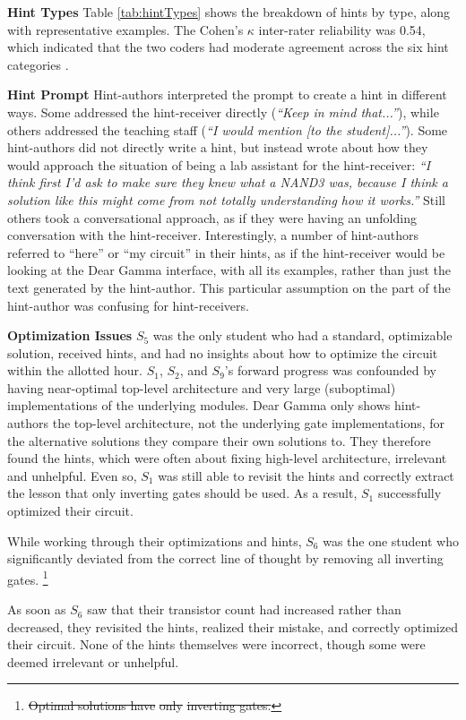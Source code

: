 \documentclass[12pt,twoside]{mitthesis}
\providecommand{\DIFaddtex}[1]{{\protect\color{blue}\uwave{#1}}} %
\providecommand{\DIFdeltex}[1]{{\protect\color{red}\sout{#1}}}                      %
\providecommand{\DIFaddbegin}{} %
\providecommand{\DIFaddend}{} %
\providecommand{\DIFdelbegin}{} %
\providecommand{\DIFdelend}{} %
\providecommand{\DIFadd}[1]{\texorpdfstring{\DIFaddtex{#1}}{#1}} %
\providecommand{\DIFdel}[1]{\texorpdfstring{\DIFdeltex{#1}}{}} %
\begin{document}
{\bf Hint Types} Table \ref{tab:hintTypes} shows the breakdown of hints by type, along with representative examples. The Cohen's $\kappa$ \cite{cohen1960coefficient} inter-rater reliability was 0.54, which indicated that the two coders had moderate agreement across the six hint categories \cite{viera2005understanding}. 

{\bf Hint Prompt} Hint-authors interpreted the prompt to create a hint in different ways. Some addressed the hint-receiver directly ({\it ``Keep in mind that...''}), while others addressed the teaching staff ({\it ``I would mention [to the student]...''}). Some hint-authors did not directly write a hint, but instead wrote about how they would approach the situation of being a lab assistant for the hint-receiver: {\it ``I think first I'd ask to make sure they knew what a NAND3 was, because I think a solution like this might come from not totally understanding how it works.''} Still others took a conversational approach, as if they were having an unfolding conversation with the hint-receiver. Interestingly, a number of hint-authors referred to ``here'' or ``my circuit'' in their hints, as if the hint-receiver would be looking at the Dear Gamma interface, with all its examples, rather than just the text generated by the hint-author. This particular assumption on the part of the hint-author was confusing for hint-receivers.

{\bf Optimization Issues} $S_5$ was the only student who had a standard, optimizable solution, received hints, and had no insights about how to optimize the circuit within the allotted hour. $S_1$, $S_2$, and $S_9$'s forward progress was confounded by having near-optimal top-level architecture and very large (suboptimal) implementations of the underlying modules. Dear Gamma only shows hint-authors the top-level architecture, not the underlying gate implementations, for the alternative solutions they compare their own solutions to. They therefore found the hints, which were often about fixing high-level architecture, irrelevant and unhelpful. Even so, $S_1$ was still able to revisit the hints and correctly extract the lesson that only inverting gates should be used. As a result, $S_1$ successfully optimized their circuit.

While working through their optimizations and hints, $S_6$ was the one student who significantly deviated from the correct line of thought by removing all inverting gates. \DIFdelbegin \footnote{\DIFdel{Optimal solutions have }%
\DIFdel{only}%
\DIFdel{inverting gates.}} %
\addtocounter{footnote}{-1}%
\DIFdelend \DIFaddbegin \DIFadd{Optimal solutions have }{\it \DIFadd{only}} \DIFadd{inverting gates. }\DIFaddend As soon as $S_6$ saw that their transistor count had increased rather than decreased, they revisited the hints, realized their mistake, and correctly optimized their circuit. None of the hints themselves were incorrect, though some were deemed irrelevant or unhelpful.
\end{document}
